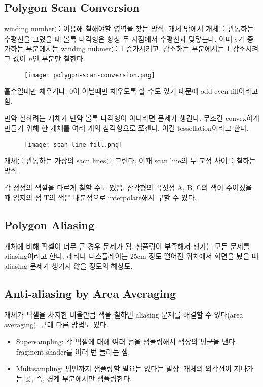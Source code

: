 \subsection{Polygon Scan Conversion}

winding number를 이용해 칠해야할 영역을 찾는 방식. 개체 밖에서 개체를 관통하는 수평선을 그렸을 때 볼록 다각형은 항상 두 지점에서 수평선과 맞닿는다. 이때 y가 증가하는 부분에서는 winding nubmer를 1 증가시키고, 감소하는 부분에서는 1 감소시켜 그 값이 $n$인 부분만 칠한다.
\begin{figure}[h]
  \centering
  \texttt{[image: polygon-scan-conversion.png]}
\end{figure}
홀수일때만 채우거나, 0이 아닐때만 채우도록 할 수도 있기 때문에 odd-even fill이라고 함.

만약 칠하려는 개체가 만약 볼록 다각형이 아니라면 문제가 생긴다. 무조건 convex하게 만들기 위해 한 개체를 여러 개의 삼각형으로 쪼갠다. 이걸 tessellation이라고 한다.
\begin{figure}[h]
  \centering
  \texttt{[image: scan-line-fill.png]}
\end{figure}
개체를 관통하는 가상의 sacn lines를 그린다. 이때 scan line의 두 교점 사이를 칠하는 방식.

각 정점의 색깔을 다르게 칠할 수도 있음. 삼각형의 꼭짓점 A, B, C의 색이 주어졌을 때 임지의 점 T의 색은 내분점으로 interpolate해서 구할 수 있다.

\subsection{Polygon Aliasing}

개체에 비해 픽셀이 너무 큰 경우 문제가 됨. 샘플링이 부족해서 생기는 모든 문제를 aliasing이라고 한다. 레티나 디스플레이는 25cm 정도 떨어진 위치에서 화면을 봤을 때 aliasing 문제가 생기지 않을 정도의 해상도.

\subsection{Anti-aliasing by Area Averaging}

개체가 픽셀을 차지한 비율만큼 색을 칠하면 aliasing 문제를 해결할 수 있다(area averaging). 근데 다른 방법도 있다.

\begin{itemize}
  \item Supersampling: 각 픽셀에 대해 여러 점을 샘플링해서 색상의 평균을 낸다. fragment shader를 여러 번 돌리는 셈.
  \item Multisampling: 평면까지 샘플링할 필요는 없다는 발상. 개체의 외각선이 지나가는 곳, 즉, 경계 부분에서만 샘플링한다.
\end{itemize}

